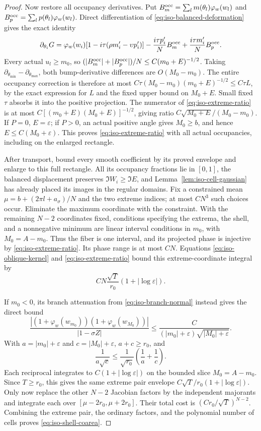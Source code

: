 \documentclass[11pt]{article}
\numberwithin{equation}{section}
\theoremstyle{definition}
\newcommand{\eps}{\varepsilon}
\begin{document}
\begin{proof}
Now restore all occupancy derivatives.  Put
$B_m^{\rm occ}=\sum_lm(\theta_l)\varphi_w(w_l)$ and
$B_p^{\rm occ}=\sum_lp(\theta_l)\varphi_w(w_l)$.
Direct differentiation of \eqref{eq:iso-balanced-deformation} gives
the exact identity
\begin{equation}\label{eq:iso-occupancy-derivative}
 \partial_{\theta_i}G
 =\varphi_w(w_i)[1-i\tau(\rho m'_i-\upsilon p'_i)]
       -\frac{i\tau p'_i}{N}B_m^{\rm occ}
       +\frac{i\tau m'_i}{N}B_p^{\rm occ}.
\end{equation}
Every actual $u_l\ge m_0$, so
$(|B_m^{\rm occ}|+|B_p^{\rm occ}|)/N\le C(m_0+E)^{-1/2}$.
Taking $\partial_{\theta_{\min}}-\partial_{\theta_{\max}}$,
both bump-derivative differences are $O(M_0-m_0)$.
The entire occupancy correction is therefore at most
$C\tau(M_0-m_0)(m_0+E)^{-1/2}\le C\tau L$, by the exact
expression for $L$ and the fixed upper bound on $M_0+E$.
Small fixed $\tau$ absorbs it into the positive projection.
The numerator of \eqref{eq:iso-extreme-ratio} is at most
$C[(m_0+E)(M_0+E)]^{-1/2}$, giving ratio
$C\sqrt{M_0+E}/(M_0-m_0)$.  If $P=0$, $E=\eps$; if $P>0$,
an actual positive angle gives $M_0\ge b$, and hence
$E\le C(M_0+\eps)$.  This proves \eqref{eq:iso-extreme-ratio}
with all actual occupancies, including on the enlarged rectangle.

After transport, bound every smooth coefficient by its proved
envelope and enlarge to this full rectangle.  All its occupancy
fractions lie in $[0,1]$, the balanced displacement preserves
$\Im W_i\ge\Im{E}$, and Lemma~\ref{lem:iso-cell-gaussian}
has already placed its images in the regular domains.
Fix a constrained mean $\mu=b+(2\pi l+a_\sigma)/N$ and the two
extreme indices; at most $CN^3$ such choices occur.  Eliminate the
maximum coordinate with the constraint.  With the remaining $N-2$
coordinates fixed, conditions specifying the extrema, the shell,
and a nonnegative minimum are linear interval conditions in $m_0$,
with $M_0=A-m_0$.  Thus the fiber is one interval, and its projected
phase is injective by \eqref{eq:iso-extreme-ratio}.  Its phase range
is at most $CN$.  Equations \eqref{eq:iso-oblique-kernel} and
\eqref{eq:iso-extreme-ratio} bound this extreme-coordinate integral by
\[
 CN\frac{\sqrt T}{r_0}(1+|\log\eps|).
\]

If $m_0<0$, its branch attenuation from
\eqref{eq:iso-branch-normal} instead gives the direct bound
\[
 \frac{|(1+\varphi_w(w_{m_0}))(1+\varphi_w(w_{M_0}))|}
      {|1-\sigma Z|}
 \le\frac{C}{(|m_0|+\eps)\sqrt{|M_0|+\eps}}.
\]
With $a=|m_0|+\eps$ and $c=|M_0|+\eps$, $a+c\ge r_0$, and
\[
 \frac1{a\sqrt c}\le\frac1{\sqrt{r_0}}\left(\frac1a+\frac1c\right).
\]
Each reciprocal integrates to $C(1+|\log\eps|)$ on the bounded
slice $M_0=A-m_0$.  Since $T\ge r_0$, this gives the same extreme
pair envelope $C\sqrt T/r_0(1+|\log\eps|)$.
Only now replace the other $N-2$ Jacobian factors by the independent
majorants and integrate each over $[\mu-2r_0,\mu+2r_0]$.
Their total cost is $(Cr_0/\sqrt T)^{N-2}$.
Combining the extreme pair, the ordinary factors, and the polynomial
number of cells proves \eqref{eq:iso-shell-coarea}.
\end{proof}
\end{document}
